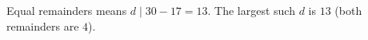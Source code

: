 Equal remainders means $d\mid30-17=13$. The largest such $d$ is $\boxed{13}$ (both remainders are $4$).
